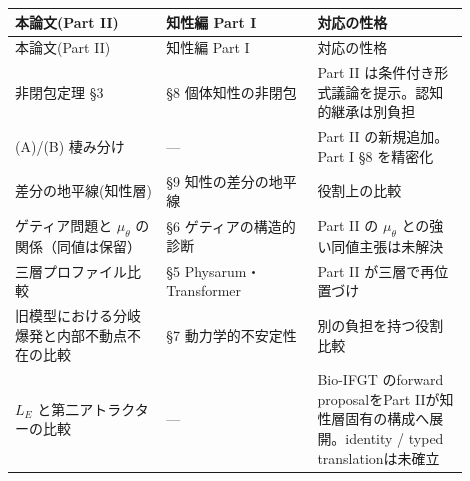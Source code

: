 \begin{longtable}{@{}p{0.30\linewidth}p{0.30\linewidth}p{0.30\linewidth}@{}}
\toprule
本論文(Part II) & 知性編 Part I & 対応の性格 \\
\midrule
\endfirsthead
\toprule
本論文(Part II) & 知性編 Part I & 対応の性格 \\
\midrule
\endhead
非閉包定理 \S{}3 & \S{}8 個体知性の非閉包 & Part II は条件付き形式議論を提示。認知的継承は別負担 \\
(A)/(B) 棲み分け & — & Part II の新規追加。Part I \S{}8 を精密化 \\
差分の地平線(知性層) & \S{}9 知性の差分の地平線 & 役割上の比較 \\
ゲティア問題と $\mu_\theta$ の関係（同値は保留） & \S{}6 ゲティアの構造的診断 & Part II の $\mu_\theta$ との強い同値主張は未解決 \\
三層プロファイル比較 & \S{}5 Physarum・Transformer & Part II が三層で再位置づけ \\
旧模型における分岐爆発と内部不動点不在の比較 & \S{}7 動力学的不安定性 & 別の負担を持つ役割比較 \\
$L_E$ と第二アトラクターの比較 & — & Bio-IFGT のforward proposalをPart IIが知性層固有の構成へ展開。identity / typed translationは未確立 \\
\bottomrule
\end{longtable}


\bigskip
